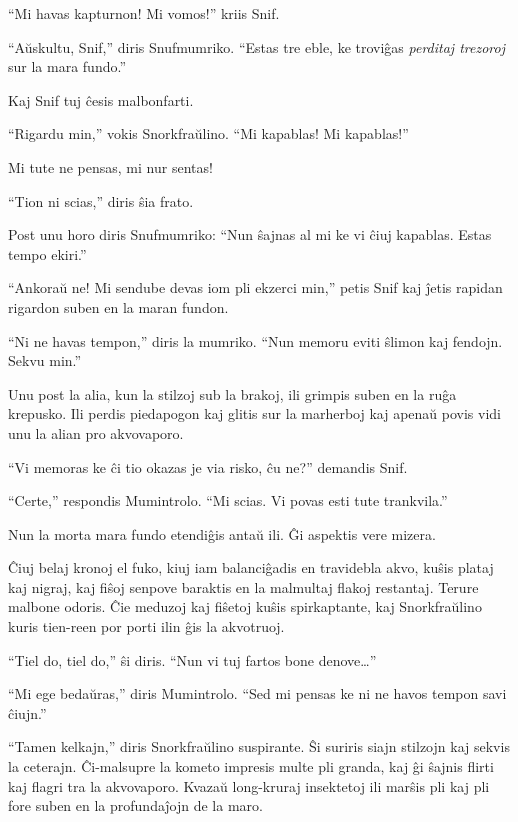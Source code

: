 ``Mi havas kapturnon! Mi vomos!'' kriis Snif.

``Aŭskultu, Snif,'' diris Snufmumriko. ``Estas tre eble, ke troviĝas \emph{perditaj trezoroj} sur la mara fundo.''

Kaj Snif tuj ĉesis malbonfarti.

``Rigardu min,'' vokis Snorkfraŭlino. ``Mi kapablas! Mi kapablas!''

Mi tute ne pensas, mi nur sentas!

``Tion ni scias,'' diris ŝia frato.

Post unu horo diris Snufmumriko: ``Nun ŝajnas al mi ke vi ĉiuj kapablas. Estas tempo ekiri.''

``Ankoraŭ ne! Mi sendube devas iom pli ekzerci min,'' petis Snif kaj ĵetis rapidan rigardon suben en la maran fundon.

``Ni ne havas tempon,'' diris la mumriko. ``Nun memoru eviti ŝlimon kaj fendojn. Sekvu min.''

Unu post la alia, kun la stilzoj sub la brakoj, ili grimpis suben en la ruĝa krepusko. Ili perdis piedapogon kaj glitis sur la marherboj kaj apenaŭ povis vidi unu la alian pro akvovaporo.

``Vi memoras ke ĉi tio okazas je via risko, ĉu ne?'' demandis Snif.

``Certe,'' respondis Mumintrolo. ``Mi scias. Vi povas esti tute trankvila.''

Nun la morta mara fundo etendiĝis antaŭ ili. Ĝi aspektis vere mizera.

Ĉiuj belaj kronoj el fuko, kiuj iam balanciĝadis en travidebla akvo, kuŝis plataj kaj nigraj, kaj fiŝoj senpove baraktis en la malmultaj flakoj restantaj. Terure malbone odoris. Ĉie meduzoj kaj fiŝetoj kuŝis spirkaptante, kaj Snorkfraŭlino kuris tien-reen por porti ilin ĝis la akvotruoj.

``Tiel do, tiel do,'' ŝi diris. ``Nun vi tuj fartos bone denove{\ldots}''

``Mi ege bedaŭras,'' diris Mumintrolo. ``Sed mi pensas ke ni ne havos tempon savi ĉiujn.''

``Tamen kelkajn,'' diris Snorkfraŭlino suspirante. Ŝi suriris siajn stilzojn kaj sekvis la ceterajn. Ĉi-malsupre la kometo impresis multe pli granda, kaj ĝi ŝajnis flirti kaj flagri tra la akvovaporo. Kvazaŭ long-kruraj insektetoj ili marŝis pli kaj pli fore suben en la profundaĵojn de la maro.

